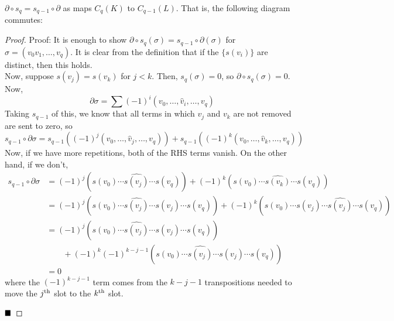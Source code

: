 
\begin{lemma}
    $\partial \circ s_q = s_{q - 1} \circ \partial$ as maps $C_q(K)$ to $C_{q - 1}(L)$. That is, the following diagram commutes:
    \begin{center}
    \end{center}
\end{lemma}
\begin{proof}{Proof:}
    It is enough to show $\partial \circ s_q(\sigma) = s_{q - 1} \circ \partial(\sigma)$ for $\sigma = (v_0v_1, \ldots, v_q)$. It is clear from the definition that if the $\{s(v_i)\}$ are distinct, then this holds.\\

    Now, suppose $s(v_j) = s(v_k)$ for $j < k$. Then, $s_q(\sigma) = 0$, so $\partial \circ s_q(\sigma) = 0$. Now,
    \[ \partial\sigma = \sum (-1)^{i}(v_0, \ldots, \widehat{v}_i, \ldots, v_q) \]
    Taking $s_{q - 1}$ of this, we know that all terms in which $v_j$ and $v_k$ are not removed are sent to zero, so
    \[ s_{q - 1} \circ \partial\sigma = s_{q - 1}((-1)^{j}(v_0, \ldots, \widehat{v}_j, \ldots, v_q)) + s_{q - 1}((-1)^{k}(v_0, \ldots, \widehat{v}_k, \ldots, v_q)) \]
    Now, if we have more repetitions, both of the RHS terms vanish. On the other hand, if we don't,
    \begin{align*}
        s_{q - 1} \circ \partial\sigma &= (-1)^{j}(s(v_0) \cdots \widehat{s(v_j)} \cdots s(v_q)) + (-1)^{k}(s(v_0) \cdots \widehat{s(v_k)} \cdots s(v_q))\\
        &= (-1)^{j}(s(v_0) \cdots \widehat{s(v_j)} \cdots s(v_j) \cdots s(v_q)) + (-1)^{k}(s(v_0) \cdots s(v_j) \cdots \widehat{s(v_j)} \cdots s(v_q))\\
        &= (-1)^{j}(s(v_0) \cdots \widehat{s(v_j)} \cdots s(v_j) \cdots s(v_q))\\
        &\qquad + (-1)^{k}(-1)^{k - j - 1}(s(v_0) \cdots \widehat{s(v_j)} \cdots s(v_j) \cdots s(v_q))\\
        &= 0
    \end{align*}
    where the $(-1)^{k - j - 1}$ term comes from the $k - j - 1$ transpositions needed to move the $j^{\tt{th}}$ slot to the $k^{\tt{th}}$ slot.

    $\qed$
\end{proof}

